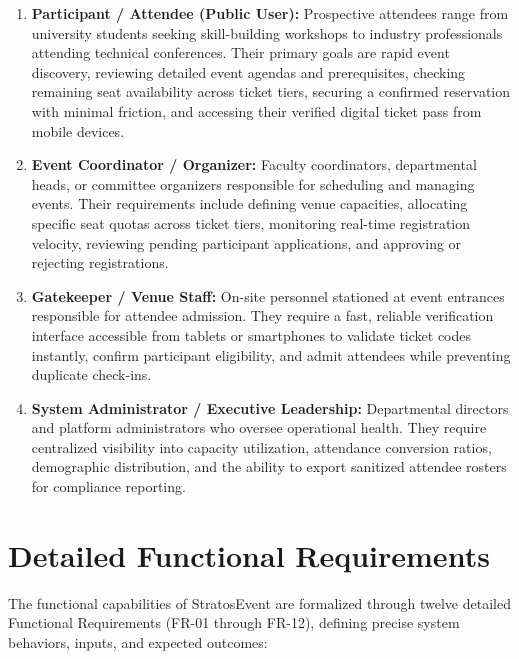 \documentclass[11pt,a4paper]{report}
\begin{document}
\begin{enumerate}[leftmargin=1.5em, itemsep=0.8em]
    \item \textbf{Participant / Attendee (Public User):} Prospective attendees range from university students seeking skill-building workshops to industry professionals attending technical conferences. Their primary goals are rapid event discovery, reviewing detailed event agendas and prerequisites, checking remaining seat availability across ticket tiers, securing a confirmed reservation with minimal friction, and accessing their verified digital ticket pass from mobile devices.
    \item \textbf{Event Coordinator / Organizer:} Faculty coordinators, departmental heads, or committee organizers responsible for scheduling and managing events. Their requirements include defining venue capacities, allocating specific seat quotas across ticket tiers, monitoring real-time registration velocity, reviewing pending participant applications, and approving or rejecting registrations.
    \item \textbf{Gatekeeper / Venue Staff:} On-site personnel stationed at event entrances responsible for attendee admission. They require a fast, reliable verification interface accessible from tablets or smartphones to validate ticket codes instantly, confirm participant eligibility, and admit attendees while preventing duplicate check-ins.
    \item \textbf{System Administrator / Executive Leadership:} Departmental directors and platform administrators who oversee operational health. They require centralized visibility into capacity utilization, attendance conversion ratios, demographic distribution, and the ability to export sanitized attendee rosters for compliance reporting.
\end{enumerate}

\section{Detailed Functional Requirements}
\justifying
The functional capabilities of StratosEvent are formalized through twelve detailed Functional Requirements (FR-01 through FR-12), defining precise system behaviors, inputs, and expected outcomes:
\end{document}
